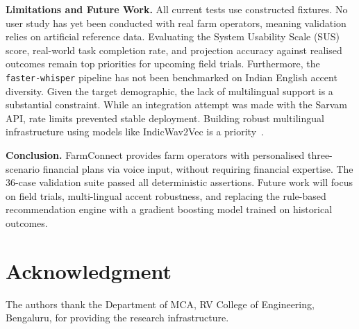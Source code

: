 \documentclass[conference]{IEEEtran}
\begin{document}
\textbf{Limitations and Future Work.} All current tests use constructed fixtures. No user study has yet been conducted with real farm operators, meaning validation relies on artificial reference data. Evaluating the System Usability Scale (SUS) score, real-world task completion rate, and projection accuracy against realised outcomes remain top priorities for upcoming field trials. Furthermore, the \texttt{faster-whisper} pipeline has not been benchmarked on Indian English accent diversity. Given the target demographic, the lack of multilingual support is a substantial constraint. While an integration attempt was made with the Sarvam API, rate limits prevented stable deployment. Building robust multilingual infrastructure using models like IndicWav2Vec is a priority~\cite{ref18}.

\textbf{Conclusion.} FarmConnect provides farm operators with personalised three-scenario financial plans via voice input, without requiring financial expertise. The 36-case validation suite passed all deterministic assertions. Future work will focus on field trials, multi-lingual accent robustness, and replacing the rule-based recommendation engine with a gradient boosting model trained on historical outcomes.

\section*{Acknowledgment}
The authors thank the Department of MCA, RV College of Engineering, Bengaluru, for providing the research infrastructure.
\end{document}
